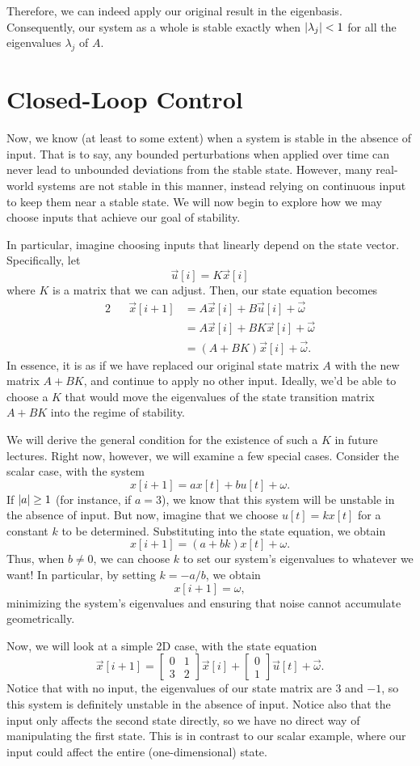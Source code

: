 \documentclass[letterpaper]{article}
\theoremstyle{remark}
\newcommand{\mat}[1]{\ensuremath{\begin{bmatrix}#1\end{bmatrix}}}
\newcommand{\eqn}[1]{\begin{alignat*}{2}#1\end{alignat*}}
\begin{document}
Therefore, we can indeed apply our original result in the eigenbasis. Consequently, our system as a whole is stable exactly when $\abs{\lambda_j} < 1$ for all the eigenvalues $\lambda_j$ of $A$.

\section{Closed-Loop Control}
Now, we know (at least to some extent) when a system is stable in the absence of input. That is to say, any bounded perturbations when applied over time can never lead to unbounded deviations from the stable state. However, many real-world systems are not stable in this manner, instead relying on continuous input to keep them near a stable state. We will now begin to explore how we may choose inputs that achieve our goal of stability.

In particular, imagine choosing inputs that linearly depend on the state vector. Specifically, let
\[
    \vec{u}[i] = K\vec{x}[i]
\]
where $K$ is a matrix that we can adjust. Then, our state equation becomes
\eqn{
    && \vec{x}[i + 1] &= A\vec{x}[i] + B\vec{u}[i] + \vec{\omega} \\
    &&&= A\vec{x}[i] + BK\vec{x}[i] + \vec{\omega} \\
    &&&= (A + BK)\vec{x}[i] + \vec{\omega}.
}
In essence, it is as if we have replaced our original state matrix $A$ with the new matrix $A + BK$, and continue to apply no other input. Ideally, we'd be able to choose a $K$ that would move the eigenvalues of the state transition matrix $A + BK$ into the regime of stability.

We will derive the general condition for the existence of such a $K$ in future lectures. Right now, however, we will examine a few special cases. Consider the scalar case, with the system
\[
    x[i + 1] = ax[t] + bu[t] + \omega.
\]
If $\abs{a} \ge 1$ (for instance, if $a = 3$), we know that this system will be unstable in the absence of input. But now, imagine that we choose $u[t] = kx[t]$ for a constant $k$ to be determined. Substituting into the state equation, we obtain
\[
    x[i + 1] = (a + bk)x[t] + \omega.
\]
Thus, when $b \ne 0$, we can choose $k$ to set our system's eigenvalues to whatever we want! In particular, by setting $k = -a/b$, we obtain
\[
    x[i + 1] = \omega,
\]
minimizing the system's eigenvalues and ensuring that noise cannot accumulate geometrically.

Now, we will look at a simple 2D case, with the state equation
\[
    \vec{x}[i + 1] = \mat{ 0 & 1 \\ 3 & 2 } \vec{x}[i] + \mat{0 \\ 1}\vec{u}[t] + \vec{\omega}.
\]
Notice that with no input, the eigenvalues of our state matrix are $3$ and $-1$, so this system is definitely unstable in the absence of input. Notice also that the input only affects the second state directly, so we have no direct way of manipulating the first state. This is in contrast to our scalar example, where our input could affect the entire (one-dimensional) state.
\end{document}
